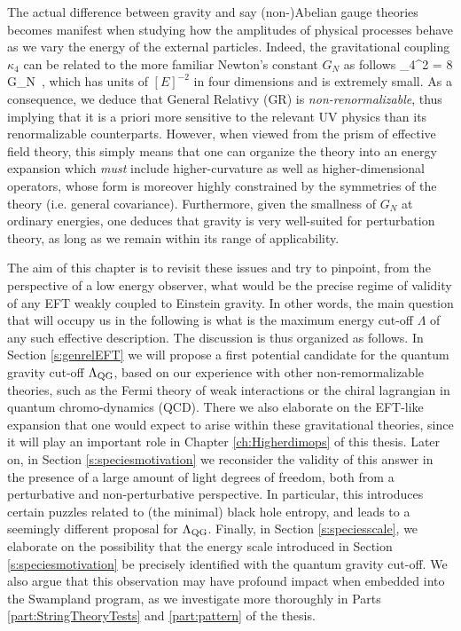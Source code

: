 The actual difference between gravity and say (non-)Abelian gauge theories becomes manifest when studying how the amplitudes of physical processes behave as we vary the energy of the external particles. Indeed, the gravitational coupling $\kappa_4$ can be related to the more familiar Newton's constant $G_N$ as follows
%
\beq
 \kappa_4^2 = 8 \pi G_N\, ,
\label{eq:gravconstant4d}
\eeq
%
which has units of $[E]^{-2}$ in four dimensions and is extremely small. As a consequence, we deduce that General Relativy (GR) is \emph{non-renormalizable}, thus implying that it is a priori more sensitive to the relevant UV physics than its renormalizable counterparts. However, when viewed from the prism of effective field theory, this simply means that one can organize the theory into an energy expansion which \emph{must} include higher-curvature as well as higher-dimensional operators, whose form is moreover highly constrained by the symmetries of the theory (i.e. general covariance). Furthermore, given the smallness of $G_N$ at ordinary energies, one deduces that gravity is very well-suited for perturbation theory, as long as we remain within its range of applicability.

The aim of this chapter is to revisit these issues and try to pinpoint, from the perspective of a low energy observer, what would be the precise regime of validity of any EFT weakly coupled to Einstein gravity. In other words, the main question that will occupy us in the following is what is the maximum energy cut-off $\Lambda$ of any such effective description. The discussion is thus organized as follows. In Section \ref{s:genrelEFT} we will propose a first potential candidate for the quantum gravity cut-off $\Lambda_{\text{QG}}$, based on our experience with other non-remormalizable theories, such as the Fermi theory of weak interactions or the chiral lagrangian in quantum chromo-dynamics (QCD). There we also elaborate on the EFT-like expansion that one would expect to arise within these gravitational theories, since it will play an important role in Chapter \ref{ch:Higherdimops} of this thesis. Later on, in Section \ref{s:speciesmotivation} we reconsider the validity of this answer in the presence of a large amount of light degrees of freedom, both from a perturbative and non-perturbative perspective. In particular, this introduces certain puzzles related to (the minimal) black hole entropy, and leads to a seemingly different proposal for $\Lambda_{\text{QG}}$. Finally, in Section \ref{s:speciesscale}, we elaborate on the possibility that the energy scale introduced in Section \ref{s:speciesmotivation} be precisely identified with the quantum gravity cut-off. We also argue that this observation may have profound impact when embedded into the Swampland program, as we investigate more thoroughly in Parts \ref{part:StringTheoryTests} and \ref{part:pattern} of the thesis.

